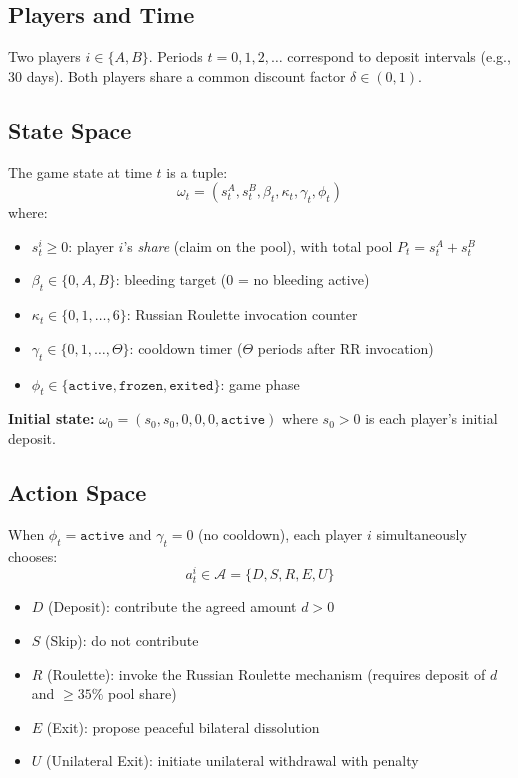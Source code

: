 \documentclass[12pt,a4paper]{article}
\begin{document}
\subsection{Players and Time}

Two players $i \in \{A, B\}$. Periods $t = 0, 1, 2, \ldots$ correspond to deposit intervals (e.g., 30 days). Both players share a common discount factor $\delta \in (0,1)$.

\subsection{State Space}

The game state at time $t$ is a tuple:
\[
\omega_t = (s_t^A, s_t^B, \beta_t, \kappa_t, \gamma_t, \phi_t)
\]
where:
\begin{itemize}
    \item $s_t^i \geq 0$: player $i$'s \textit{share} (claim on the pool), with total pool $P_t = s_t^A + s_t^B$
    \item $\beta_t \in \{0, A, B\}$: bleeding target ($0$ = no bleeding active)
    \item $\kappa_t \in \{0, 1, \ldots, 6\}$: Russian Roulette invocation counter
    \item $\gamma_t \in \{0, 1, \ldots, \Theta\}$: cooldown timer ($\Theta$ periods after RR invocation)
    \item $\phi_t \in \{\texttt{active}, \texttt{frozen}, \texttt{exited}\}$: game phase
\end{itemize}

\textbf{Initial state:} $\omega_0 = (s_0, s_0, 0, 0, 0, \texttt{active})$ where $s_0 > 0$ is each player's initial deposit.

\subsection{Action Space}

When $\phi_t = \texttt{active}$ and $\gamma_t = 0$ (no cooldown), each player $i$ simultaneously chooses:
\[
a_t^i \in \mathcal{A} = \{D, S, R, E, U\}
\]
\begin{itemize}
    \item $D$ (Deposit): contribute the agreed amount $d > 0$
    \item $S$ (Skip): do not contribute
    \item $R$ (Roulette): invoke the Russian Roulette mechanism (requires deposit of $d$ and $\geq 35\%$ pool share)
    \item $E$ (Exit): propose peaceful bilateral dissolution
    \item $U$ (Unilateral Exit): initiate unilateral withdrawal with penalty
\end{itemize}
\end{document}
